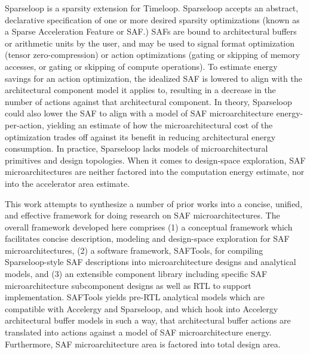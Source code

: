 Sparseloop\cite{sparseloop} is a sparsity extension for Timeloop. Sparseloop accepts an abstract, declarative specification of one or more desired sparsity optimizations (known as a Sparse Acceleration Feature or SAF.) SAFs are bound to architectural buffers or arithmetic units by the user, and may be used to signal format optimization (tensor zero-compression) or action optimizations (gating or skipping of memory accesses, or gating or skipping of compute operations)\cite{sparseloop}. To estimate energy savings for an action optimization, the idealized SAF is lowered to align with the architectural component model it applies to, resulting in a decrease in the number of actions against that architectural component. In theory, Sparseloop could also lower the SAF to align with a model of SAF microarchitecture energy-per-action, yielding an estimate of how the microarchitectural cost of the optimization trades off against its benefit in reducing architectural energy consumption. In practice, Sparseloop lacks models of microarchitectural primitives and design topologies. When it comes to design-space exploration, SAF microarchitectures are neither factored into the computation energy estimate, nor into the accelerator area estimate.

This work attempts to synthesize a number of prior works into a concise, unified, and effective framework for doing research on SAF microarchitectures. The overall framework developed here comprises (1) a conceptual framework which facilitates concise description, modeling and design-space exploration for SAF microarchitectures, (2) a software framework, SAFTools, for compiling Sparseloop-style SAF descriptions into microarchitecture designs and analytical models, and (3) an extensible component library including specific SAF microarchitecture subcomponent designs as well as RTL to support implementation. SAFTools yields pre-RTL analytical models which are compatible with Accelergy and Sparseloop, and which hook into Accelergy architectural buffer models in such a way, that architectural buffer actions are translated into actions against a model of SAF microarchitecture energy. Furthermore, SAF microarchitecture area is factored into total design area. 

